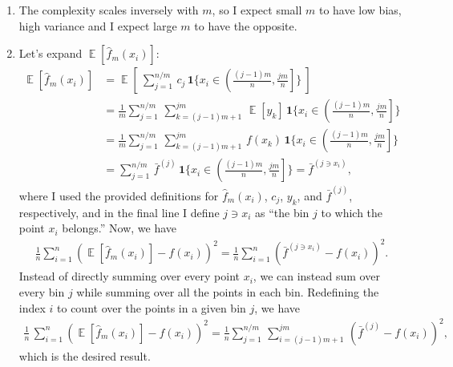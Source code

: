 \documentclass{article}
\DeclareMathOperator{\E}{\mathbb{E}}
\begin{document}
\begin{enumerate}
        \item The complexity scales inversely with $m$, so I expect small $m$ to have low bias, high variance and I expect large $m$ to have the opposite.
        \item Let's expand $\E[\hat{f}_m(x_i)]$:
        \begin{align*}
                \E[\hat{f}_m(x_i)] 
                &= \E \left[ ~ \sum_{j=1}^{n/m} \, c_j \, \mathbf{1}\{x_i \in \left( \frac{(j-1)m}{n} , \frac{jm}{n}\right]\} ~ \right] \\
                &= \frac{1}{m} \sum_{j=1}^{n/m} \, \sum_{k=(j-1)m+1}^{jm} \, \E[y_k] \, \mathbf{1}\{x_i \in \left( \frac{(j-1)m}{n} , \frac{jm}{n}\right]\} \\
                &= \frac{1}{m} \sum_{j=1}^{n/m} \, \sum_{k=(j-1)m+1}^{jm} \, f(x_k) \, \mathbf{1}\{x_i \in \left( \frac{(j-1)m}{n} , \frac{jm}{n}\right]\} \\
                &= \sum_{j=1}^{n/m} \, \bar{f}^{(j)} \, \mathbf{1}\{x_i \in \left( \frac{(j-1)m}{n} , \frac{jm}{n}\right]\}
                = \bar{f}^{(j \ni x_i)},
        \end{align*}
        where I used the provided definitions for $\hat{f}_m(x_i)$, $c_j$, $y_k$, and $\bar{f}^{(j)}$, respectively, and in the final line I define $j \ni x_i$ as ``the bin $j$ to which the point $x_i$ belongs.''
        Now, we have
        \begin{align*}
                \frac{1}{n} \sum_{i=1}^n \left( \E[\hat{f}_m(x_i)] - f(x_i) \right)^2
                = \frac{1}{n} \sum_{i=1}^n \left( \bar{f}^{(j \ni x_i)} - f(x_i) \right)^2.
        \end{align*}
        Instead of directly summing over every point $x_i$, we can instead sum over every bin $j$ while summing over all the points in each bin.
        Redefining the index $i$ to count over the points in a given bin $j$, we have
        \begin{align*}
                \frac{1}{n} \, \sum_{i=1}^n \left( \E[\hat{f}_m(x_i)] - f(x_i) \right)^2
                = \frac{1}{n} \sum_{j=1}^{n/m} \, \sum_{i=(j-1)m+1}^{jm} \, (\bar{f}^{(j)} - f(x_i))^2,
        \end{align*}
        which is the desired result.


\end{enumerate}
\end{document}
